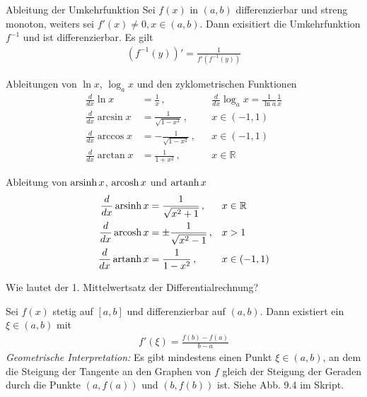 \begin{karte}{Ableitung der Umkehrfunktion}
	Sei \( f(x) \) in \((a,b)\) differenzierbar und streng monoton, weiters sei \(f'(x)\neq 0, x\in(a,b)\). Dann exisitiert die Umkehrfunktion \(f^{-1}\) und ist differenzierbar. Es gilt
	\begin{align}
		(f^{-1}(y))'=\frac{1}{f'(f^{-1}(y))}
	\end{align}
\end{karte}

\begin{karte}{Ableitungen von \(\ln{x}\), \(\log_{a}{x}\) und den zyklometrischen Funktionen}
	\begin{align}
		\frac{d}{dx}\ln{x}     & =\frac{1}{x}\, ,            &   & \frac{d}{dx}\log_a x = \frac{1}{\ln{a}}\frac{1}{x} \\
		\frac{d}{dx}\arcsin{x} & =\frac{1}{\sqrt{1-x^2}}\, , &   & x\in(-1,1)                                         \\
		\frac{d}{dx}\arccos{x} & =-\frac{1}{\sqrt{1-x^2}}\,, &   & x\in(-1,1)                                         \\
		\frac{d}{dx}\arctan{x} & =\frac{1}{1+x^2}\, ,        &   & x\in\mathbb{R}
	\end{align}
\end{karte}

\begin{karte}{Ableitung von \(\operatorname{arsinh}{x}\), \(\operatorname{arcosh}{x}\) und \(\operatorname{artanh}{x}\)}
	\begin{align}
		\frac{d}{dx}\operatorname{arsinh}{x} & =\frac{1}{\sqrt{x^2+1}}\, ,      & x & \in\mathbb{R} \\
		\frac{d}{dx}\operatorname{arcosh}{x} & =\pm\frac{1}{{\sqrt{x^2-1}}}\, , & x & >1            \\
		\frac{d}{dx}\operatorname{artanh}{x} & =\frac{1}{1-x^2}\, ,             & x & \in(-1,1)
	\end{align}
\end{karte}

\begin{karte}{Wie lautet der 1. Mittelwertsatz der Differentialrechnung?}

	Sei \(f(x)\) stetig auf \([a,b]\) und differenzierbar auf \((a,b)\). Dann existiert ein \(\xi \in (a,b)\) mit
	\begin{align}
		f'(\xi)=\frac{f(b)-f(a)}{b-a}
	\end{align}
	{\large
		\emph{Geometrische Interpretation:} Es gibt mindestens einen Punkt \(\xi \in (a,b)\), an dem die Steigung der Tangente an den Graphen von $f$ gleich der Steigung der Geraden durch die Punkte \((a, f(a))\) und \((b, f(b))\) ist. Siehe Abb. 9.4 im Skript.
	}
\end{karte}



